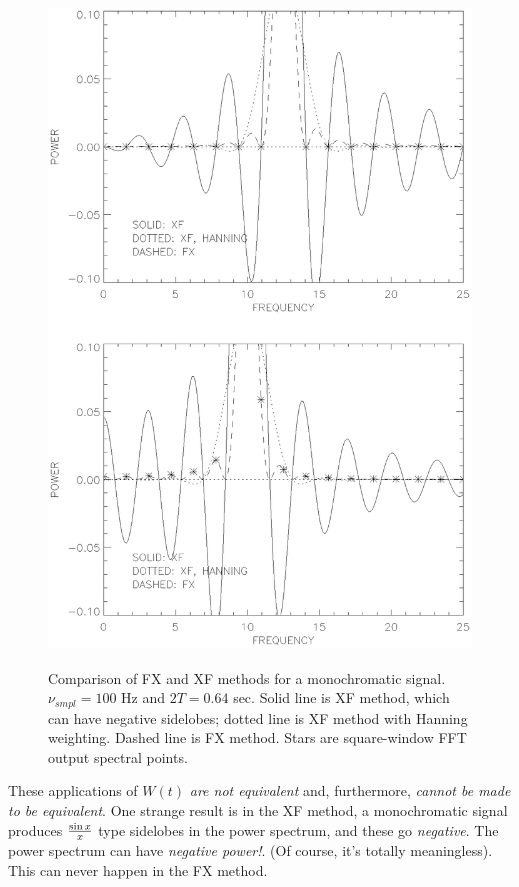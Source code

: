 \documentclass[psfig,preprint]{aastex}
\begin{document}
\begin{figure}[p!] 
\begin{center} 
\leavevmode
\includegraphics[height=7in]{fig4.ps} 
\end{center} 

\caption{Comparison of FX and XF methods for a monochromatic signal.
$\nu_{smpl}=100$ Hz and $2T= 0.64$ sec. Solid line is XF method, which
can have negative sidelobes; dotted line is XF method with Hanning
weighting. Dashed line is FX method. Stars are square-window FFT output
spectral points. \label{figfour}} \end{figure}

	These applications of $W(t)$ {\it are not equivalent} and,
furthermore, {\it cannot be made to be equivalent}. One strange result
is in the XF method, a monochromatic signal produces $\sin x \over x$
type sidelobes in the power spectrum, and these go {\it negative}. The
power spectrum can have {\it negative power!}. (Of course, it's totally
meaningless). This can never happen in the FX method.
\end{document}
